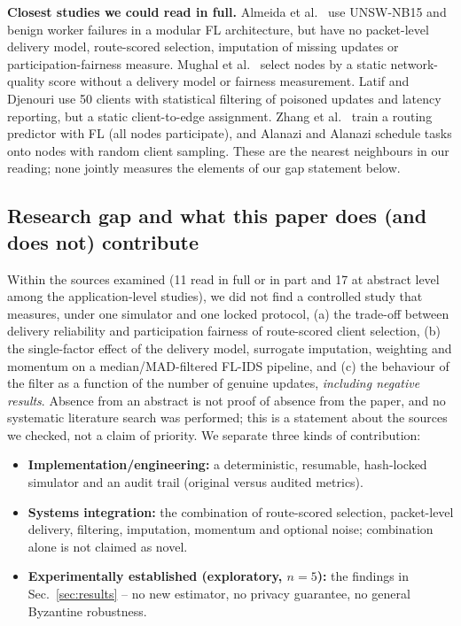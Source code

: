 \textbf{Closest studies we could read in full.} Almeida et al.\ \cite{almeida2025modular} use UNSW-NB15 and benign worker failures in a modular FL architecture, but have no packet-level delivery model, route-scored selection, imputation of missing updates or participation-fairness measure. Mughal et al.\ \cite{mughal2024adaptive} select nodes by a static network-quality score without a delivery model or fairness measurement. Latif and Djenouri \cite{latif2026multimodel} use 50 clients with statistical filtering of poisoned updates and latency reporting, but a static client-to-edge assignment. Zhang et al.\ \cite{zhang2026adaptive} train a routing predictor with FL (all nodes participate), and Alanazi and Alanazi \cite{alanazi2026edgeguard} schedule tasks onto nodes with random client sampling. These are the nearest neighbours in our reading; none jointly measures the elements of our gap statement below.

\subsection*{Research gap and what this paper does (and does not) contribute}
Within the sources examined (11 read in full or in part and 17 at abstract level among the application-level studies), we did not find a controlled study that measures, under one simulator and one locked protocol, (a) the trade-off between delivery reliability and participation fairness of route-scored client selection, (b) the single-factor effect of the delivery model, surrogate imputation, weighting and momentum on a median/MAD-filtered FL-IDS pipeline, and (c) the behaviour of the filter as a function of the number of genuine updates, \emph{including negative results}. Absence from an abstract is not proof of absence from the paper, and no systematic literature search was performed; this is a statement about the sources we checked, not a claim of priority. We separate three kinds of contribution:
\begin{itemize}
\item \textbf{Implementation/engineering:} a deterministic, resumable, hash-locked simulator and an audit trail (original versus audited metrics).
\item \textbf{Systems integration:} the combination of route-scored selection, packet-level delivery, filtering, imputation, momentum and optional noise; combination alone is not claimed as novel.
\item \textbf{Experimentally established (exploratory, $n=5$):} the findings in Sec.~\ref{sec:results} -- no new estimator, no privacy guarantee, no general Byzantine robustness.
\end{itemize}

